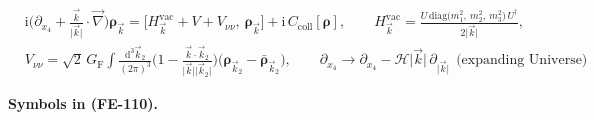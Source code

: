 \documentclass[
  10pt,
]{article}
\begin{document}
\[
\begin{aligned}
&\mathrm{i}\Big(\partial_{x_4} + \frac{\vec k}{\lvert\vec
 k\rvert}\cdot\vec\nabla\Big)\boldsymbol{\rho}_{\vec k}
 = \big[H^{\mathrm{vac}}_{\vec k} + V + V_{\nu\nu},\ \boldsymbol{\rho}_{\vec k}\big] +
 \mathrm{i}\,C_{\mathrm{coll}}[\boldsymbol{\rho}],
 \qquad H^{\mathrm{vac}}_{\vec k} =
 \frac{U\,\mathrm{diag}\big(m_1^2,\ m_2^2,\ m_3^2\big)\,U^\dagger}{2\lvert\vec k\rvert},\\
&V_{\nu\nu} = \sqrt2\,G_{\mathrm{F}}\int\frac{\mathrm{d}^3\vec k_2}{(2\pi)^3}\Big(1 - \frac{\vec
 k\cdot\vec k_2}{\lvert\vec k\rvert\lvert\vec k_2\rvert}\Big)
 \big(\boldsymbol{\rho}_{\vec k_2} - \bar{\boldsymbol{\rho}}_{\vec k_2}\big),\qquad
 \partial_{x_4} \to \partial_{x_4} - \mathcal{H}\lvert\vec k\rvert\,\partial_{\lvert\vec
 k\rvert}\ \ \text{(expanding Universe)}
\end{aligned} \tag{FE-110}
\]

\textbf{Symbols in (FE-110).}
\end{document}
